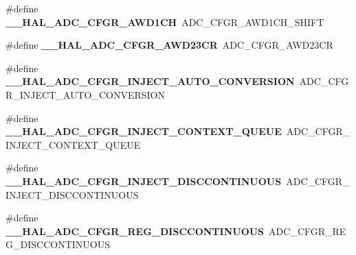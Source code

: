 \begin{DoxyCompactItemize}
\item 
\hypertarget{group___h_a_l___a_d_c___aliased___macros_gaf2b93300d6c91bbe5a0253368ade466f}{\#define {\bfseries \-\_\-\-\_\-\-H\-A\-L\-\_\-\-A\-D\-C\-\_\-\-C\-F\-G\-R\-\_\-\-A\-W\-D1\-C\-H}~A\-D\-C\-\_\-\-C\-F\-G\-R\-\_\-\-A\-W\-D1\-C\-H\-\_\-\-S\-H\-I\-F\-T}\label{group___h_a_l___a_d_c___aliased___macros_gaf2b93300d6c91bbe5a0253368ade466f}

\item 
\hypertarget{group___h_a_l___a_d_c___aliased___macros_ga73200fff4fe5aa62989ea33522fa3cfc}{\#define {\bfseries \-\_\-\-\_\-\-H\-A\-L\-\_\-\-A\-D\-C\-\_\-\-C\-F\-G\-R\-\_\-\-A\-W\-D23\-C\-R}~A\-D\-C\-\_\-\-C\-F\-G\-R\-\_\-\-A\-W\-D23\-C\-R}\label{group___h_a_l___a_d_c___aliased___macros_ga73200fff4fe5aa62989ea33522fa3cfc}

\item 
\hypertarget{group___h_a_l___a_d_c___aliased___macros_ga16b4ff7c58c0fe8141bd8bf6adf0f27c}{\#define {\bfseries \-\_\-\-\_\-\-H\-A\-L\-\_\-\-A\-D\-C\-\_\-\-C\-F\-G\-R\-\_\-\-I\-N\-J\-E\-C\-T\-\_\-\-A\-U\-T\-O\-\_\-\-C\-O\-N\-V\-E\-R\-S\-I\-O\-N}~A\-D\-C\-\_\-\-C\-F\-G\-R\-\_\-\-I\-N\-J\-E\-C\-T\-\_\-\-A\-U\-T\-O\-\_\-\-C\-O\-N\-V\-E\-R\-S\-I\-O\-N}\label{group___h_a_l___a_d_c___aliased___macros_ga16b4ff7c58c0fe8141bd8bf6adf0f27c}

\item 
\hypertarget{group___h_a_l___a_d_c___aliased___macros_ga5010d7820f890534d6b6005438038ef5}{\#define {\bfseries \-\_\-\-\_\-\-H\-A\-L\-\_\-\-A\-D\-C\-\_\-\-C\-F\-G\-R\-\_\-\-I\-N\-J\-E\-C\-T\-\_\-\-C\-O\-N\-T\-E\-X\-T\-\_\-\-Q\-U\-E\-U\-E}~A\-D\-C\-\_\-\-C\-F\-G\-R\-\_\-\-I\-N\-J\-E\-C\-T\-\_\-\-C\-O\-N\-T\-E\-X\-T\-\_\-\-Q\-U\-E\-U\-E}\label{group___h_a_l___a_d_c___aliased___macros_ga5010d7820f890534d6b6005438038ef5}

\item 
\hypertarget{group___h_a_l___a_d_c___aliased___macros_gaeaa692ac73b859de118c28bc0327cf77}{\#define {\bfseries \-\_\-\-\_\-\-H\-A\-L\-\_\-\-A\-D\-C\-\_\-\-C\-F\-G\-R\-\_\-\-I\-N\-J\-E\-C\-T\-\_\-\-D\-I\-S\-C\-C\-O\-N\-T\-I\-N\-U\-O\-U\-S}~A\-D\-C\-\_\-\-C\-F\-G\-R\-\_\-\-I\-N\-J\-E\-C\-T\-\_\-\-D\-I\-S\-C\-C\-O\-N\-T\-I\-N\-U\-O\-U\-S}\label{group___h_a_l___a_d_c___aliased___macros_gaeaa692ac73b859de118c28bc0327cf77}

\item 
\hypertarget{group___h_a_l___a_d_c___aliased___macros_gad118cacc67e8c3f930008f5aa6d8dade}{\#define {\bfseries \-\_\-\-\_\-\-H\-A\-L\-\_\-\-A\-D\-C\-\_\-\-C\-F\-G\-R\-\_\-\-R\-E\-G\-\_\-\-D\-I\-S\-C\-C\-O\-N\-T\-I\-N\-U\-O\-U\-S}~A\-D\-C\-\_\-\-C\-F\-G\-R\-\_\-\-R\-E\-G\-\_\-\-D\-I\-S\-C\-C\-O\-N\-T\-I\-N\-U\-O\-U\-S}\label{group___h_a_l___a_d_c___aliased___macros_gad118cacc67e8c3f930008f5aa6d8dade}


\end{DoxyCompactItemize}
